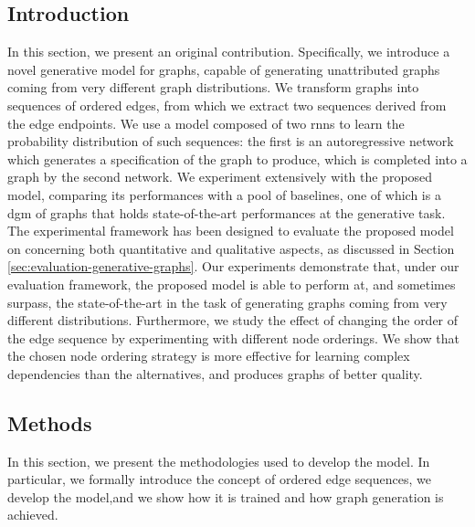 \subsection{Introduction}
In this section, we present an original contribution. Specifically, we introduce a novel generative model for graphs, capable of generating unattributed graphs coming from very different graph distributions. We transform graphs into sequences of ordered edges, from which we extract two sequences derived from the edge endpoints. We use a model composed of two \glspl{rnn} to learn the probability distribution of such sequences: the first is an autoregressive network which generates a specification of the graph to produce, which is completed into a graph by the second network. We experiment extensively with the proposed model, comparing its performances with a pool of baselines, one of which is a \gls{dgm} of graphs that holds state-of-the-art performances at the generative task. The experimental framework has been designed to evaluate the proposed model on concerning both quantitative and qualitative aspects, as discussed in Section \ref{sec:evaluation-generative-graphs}. Our experiments demonstrate that, under our evaluation framework, the proposed model is able to perform at, and sometimes surpass, the state-of-the-art in the task of generating graphs coming from very different distributions. Furthermore, we study the effect of changing the order of the edge sequence by experimenting with different node orderings. We show that the chosen node ordering strategy  is more effective for learning complex dependencies than the alternatives, and produces graphs of better quality.

\subsection{Methods}
In this section, we present the methodologies used to develop the model. In particular, we formally introduce the concept of ordered edge sequences, we develop the model,and  we show how it is trained and how graph generation is achieved.

